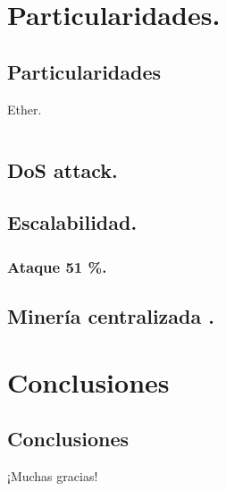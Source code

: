 \documentclass[usenames,dvipsnames]{beamer}
\begin{document}
\section{ Particularidades. }
\subsection{Particularidades}

\begin{frame}{ Ether. }

	\begin{columns}


   

\end{columns}

\end{frame}
\subsection{ DoS attack. }
\subsection{ Escalabilidad. }
\subsubsection{ Ataque 51 \%. }
\subsection{ Minería centralizada .}

\section{Conclusiones}
\subsection{Conclusiones}
\begin{frame}[standout]
  ¡Muchas gracias!
\end{frame}
\end{document}
